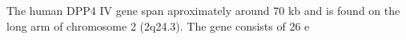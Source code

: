 The human DPP4 IV gene span aproximately around 70 kb and is found on the long arm of chromosome 2 (2q24.3). The gene consists of 26 e